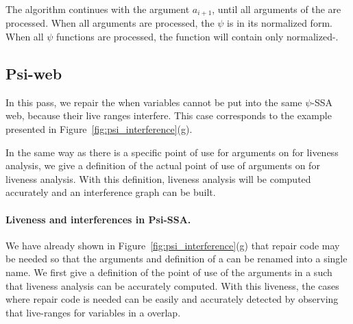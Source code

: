 The algorithm continues with the argument ${a_{i+1}}$, until all
arguments of the \psifun are processed. When all arguments
are processed, the $\psi$ is in its normalized form. When all $\psi$
functions are processed, the function will contain only
normalized-\psifuns.


\subsection{Psi-web}

In this pass, we repair the \psifuns when variables cannot be
put into the same $\psi$-SSA web, because their live ranges
interfere. This case corresponds to the example presented in
Figure~\ref{fig:psi_interference}(g).

In the same way as there is a specific point of use for arguments on
\phifuns for liveness analysis, we give a definition of the
actual point of use of arguments on \psifuns for liveness
analysis. With this definition, liveness analysis will be computed
accurately and an interference graph can be built.

\paragraph{Liveness and interferences in Psi-SSA.}
We have already shown in Figure~\ref{fig:psi_interference}(g) that
repair code may be needed so that the arguments and definition of a
\psifun can be renamed into a single name. We first give a
definition of the point of use of the arguments in a \psifun
such that liveness analysis can be accurately computed. With this
liveness, the cases where repair code is needed can be easily and
accurately detected by observing that live-ranges for variables in a
\psifun overlap.

